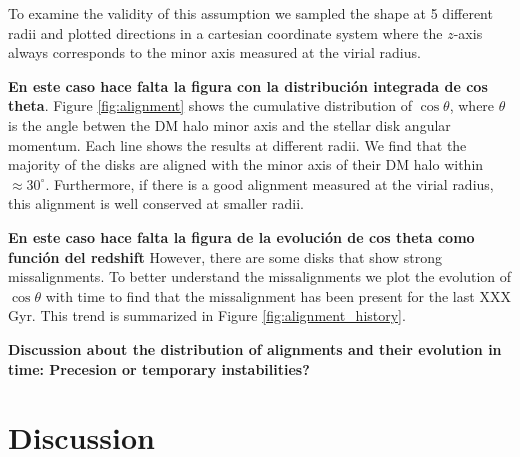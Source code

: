 \documentclass[a4paper,fleqn,usenatbib]{mnras}
\begin{document}
To examine the validity of this assumption  we sampled the shape at 5
different radii and plotted  directions in a cartesian coordinate
system where the $z$-axis always corresponds to the minor axis
measured at the virial radius.

{\bf En este caso hace falta la figura con la distribuci\'on integrada de cos theta}.
Figure \ref{fig:alignment} shows the cumulative distribution of
$\cos\theta$, where $\theta$ is the angle betwen the DM halo minor
axis and the stellar disk angular momentum.  
Each line shows the results at different radii.
We find that the majority of the disks are aligned with the minor axis
of their DM halo within $\approx 30^{\circ}$. 
Furthermore, if there is a good alignment measured at the virial
radius, this alignment is well conserved at smaller radii.

{\bf En este caso hace falta la figura de la evoluci\'on de cos theta
  como funci\'on del redshift}
However, there are some disks that show strong missalignments. 
To better understand the missalignments we plot the evolution of
$\cos\theta$ with time to find that the missalignment has been present
for the last XXX Gyr.
This trend is summarized in Figure \ref{fig:alignment_history}.


\textbf{Discussion about the distribution of alignments and their
  evolution in time: Precesion or temporary instabilities?} 

\section{Discussion}
\end{document}
